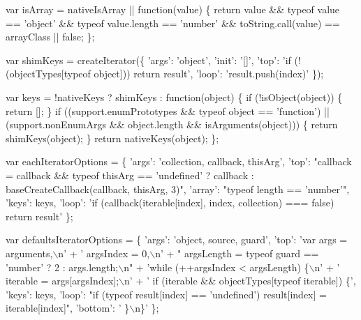 \begin{DoxyCodeInclude}
    var isArray = nativeIsArray || \textcolor{keyword}{function}(value) \{
      \textcolor{keywordflow}{return} value && typeof value == \textcolor{stringliteral}{'object'} && typeof value.length == \textcolor{stringliteral}{'number'} &&
        toString.call(value) == arrayClass || \textcolor{keyword}{false};
    \};

    var shimKeys = createIterator(\{
      \textcolor{stringliteral}{'args'}: \textcolor{stringliteral}{'object'},
      \textcolor{stringliteral}{'init'}: \textcolor{stringliteral}{'[]'},
      \textcolor{stringliteral}{'top'}: \textcolor{stringliteral}{'if (!(objectTypes[typeof object])) return result'},
      \textcolor{stringliteral}{'loop'}: \textcolor{stringliteral}{'result.push(index)'}
    \});

    var keys = !nativeKeys ? shimKeys : \textcolor{keyword}{function}(object) \{
      \textcolor{keywordflow}{if} (!isObject(\textcolor{keywordtype}{object})) \{
        \textcolor{keywordflow}{return} [];
      \}
      \textcolor{keywordflow}{if} ((support.enumPrototypes && typeof \textcolor{keywordtype}{object} == \textcolor{stringliteral}{'function'}) ||
          (support.nonEnumArgs && \textcolor{keywordtype}{object}.length && isArguments(\textcolor{keywordtype}{object}))) \{
        \textcolor{keywordflow}{return} shimKeys(\textcolor{keywordtype}{object});
      \}
      \textcolor{keywordflow}{return} nativeKeys(\textcolor{keywordtype}{object});
    \};

    var eachIteratorOptions = \{
      \textcolor{stringliteral}{'args'}: \textcolor{stringliteral}{'collection, callback, thisArg'},
      \textcolor{stringliteral}{'top'}: \textcolor{stringliteral}{"callback = callback && typeof thisArg == 'undefined' ? callback :
       baseCreateCallback(callback, thisArg, 3)"},
      \textcolor{stringliteral}{'array'}: \textcolor{stringliteral}{"typeof length == 'number'"},
      \textcolor{stringliteral}{'keys'}: keys,
      \textcolor{stringliteral}{'loop'}: \textcolor{stringliteral}{'if (callback(iterable[index], index, collection) === false) return result'}
    \};

    var defaultsIteratorOptions = \{
      \textcolor{stringliteral}{'args'}: \textcolor{stringliteral}{'object, source, guard'},
      \textcolor{stringliteral}{'top'}:
        \textcolor{stringliteral}{'var args = arguments,\(\backslash\)n'} +
        \textcolor{stringliteral}{'    argsIndex = 0,\(\backslash\)n'} +
        \textcolor{stringliteral}{"    argsLength = typeof guard == 'number' ? 2 : args.length;\(\backslash\)n"} +
        \textcolor{stringliteral}{'while (++argsIndex < argsLength) \{\(\backslash\)n'} +
        \textcolor{stringliteral}{'  iterable = args[argsIndex];\(\backslash\)n'} +
        \textcolor{stringliteral}{'  if (iterable && objectTypes[typeof iterable]) \{'},
      \textcolor{stringliteral}{'keys'}: keys,
      \textcolor{stringliteral}{'loop'}: \textcolor{stringliteral}{"if (typeof result[index] == 'undefined') result[index] = iterable[index]"},
      \textcolor{stringliteral}{'bottom'}: \textcolor{stringliteral}{'  \}\(\backslash\)n\}'}
    \};


\end{DoxyCodeInclude}
